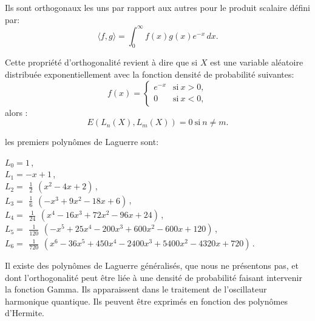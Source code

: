 \medskip
Ils sont orthogonaux les uns par rapport aux autres pour le produit 
scalaire défini par:
\begin{equation}
    \langle f,g \rangle = \int_0^\infty f(x) g(x) e^{-x}\,dx.
\end{equation}

\medskip
Cette propriété d'orthogonalité revient à dire que si $X$ est une variable aléatoire 
distribuée exponentiellement avec la fonction densité de probabilité suivantes:
\begin{equation}
    f(x)=\left\{\begin{matrix} e^{-x} & \mbox{si}\ x>0, \\ 0 & \mbox{si}\ x<0, \end{matrix}\right.
\end{equation}
alors :
\begin{equation}
    E(L_n(X),L_m(X))=0\ \mbox{si}\ n\neq m. 
\end{equation}


\medskip
{}
les premiers polynômes de Laguerre sont:

\noindent
$L_0 =	1\,$,\\
$L_1= 	-x+1\,$,\\
$L_2= 	\begin{matrix}\frac12\end{matrix} (x^2-4x+2) \,$,\\
$L_3= 	\begin{matrix}\frac16\end{matrix} (-x^3+9x^2-18x+6) \,$,\\
$L_4= 	\begin{matrix}\frac1{24}\end{matrix} (x^4-16x^3+72x^2-96x+24) \,$,\\
$L_5= 	\begin{matrix}\frac1{120}\end{matrix} (-x^5+25x^4-200x^3+600x^2-600x+120) \,$,\\
$L_6= 	\begin{matrix}\frac1{720}\end{matrix} (x^6-36x^5+450x^4-2400x^3+5400x^2-4320x+720) \,$.

\medskip
Il existe des polynômes de Laguerre 
généralisés, que nous ne présentons pas,
et dont l'orthogonalité peut être liée à une densité de probabilité faisant intervenir
la fonction Gamma. Ils apparaissent dans le traitement de l'oscillateur harmonique quantique.
Ils peuvent être exprimés en fonction des polynômes d'Hermite.




